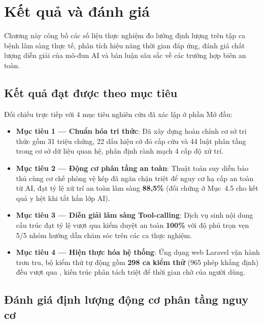 \chapter{Kết quả và đánh giá}
\label{ch:ketqua}

\begin{muctieu}
Chương này công bố các số liệu thực nghiệm đo lường định lượng trên tập ca
bệnh lâm sàng thực tế, phân tích hiệu năng thời gian đáp ứng, đánh giá chất
lượng diễn giải của mô-đun AI và bàn luận sâu sắc về các trường hợp biên an toàn.
\end{muctieu}

\section{Kết quả đạt được theo mục tiêu}

Đối chiếu trực tiếp với 4 mục tiêu nghiên cứu đã xác lập ở phần Mở đầu:
\begin{itemize}[leftmargin=1.6em, itemsep=2pt]
  \item \textbf{Mục tiêu 1 — Chuẩn hóa tri thức}: Đã xây dựng hoàn chỉnh cơ sở
        tri thức gồm 31 triệu chứng, 22 dấu hiệu cờ đỏ cấp cứu và 44 luật phân
        tầng trong cơ sở dữ liệu quan hệ, phân định rành mạch 4 cấp độ xử trí.
  \item \textbf{Mục tiêu 2 — Động cơ phân tầng an toàn}: Thuật toán suy diễn bảo
        thủ  cùng cơ chế phòng vệ kép đã ngăn chặn triệt để
        nguy cơ hạ cấp an toàn từ AI, đạt tỷ lệ xử trí an toàn lâm sàng \textbf{88,5\%}
        (đối chứng ở Mục~4.5 cho kết quả y hệt khi tắt hẳn lớp AI).
  \item \textbf{Mục tiêu 3 — Diễn giải lâm sàng Tool-calling}: Dịch vụ
         sinh nội dung cấu trúc đạt tỷ lệ vượt
        qua kiểm duyệt an toàn \textbf{100\%} với độ phủ trọn vẹn 5/5 nhóm
        hướng dẫn chăm sóc trên các ca thực nghiệm.
  \item \textbf{Mục tiêu 4 — Hiện thực hóa hệ thống}: Ứng dụng web Laravel vận
        hành trơn tru, bộ kiểm thử tự động gồm \textbf{298 ca kiểm thử} (965 phép
        khẳng định) đều vượt qua , kiến trúc  phân
        tách triệt để thời gian chờ của người dùng.
\end{itemize}

\section{Đánh giá định lượng động cơ phân tầng nguy cơ}

